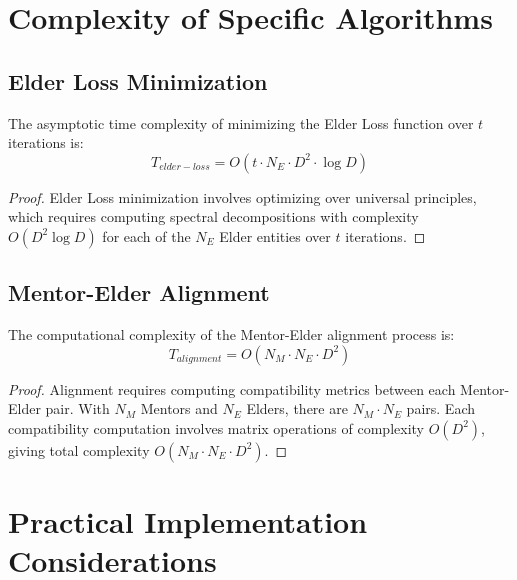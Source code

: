 \section{Complexity of Specific Algorithms}

\subsection{Elder Loss Minimization}

\begin{theorem}
The asymptotic time complexity of minimizing the Elder Loss function over $t$ iterations is:
\begin{equation}
T_{elder-loss} = O(t \cdot N_E \cdot D^2 \cdot \log D)
\end{equation}
\end{theorem}

\begin{proof}
Elder Loss minimization involves optimizing over universal principles, which requires computing spectral decompositions with complexity $O(D^2 \log D)$ for each of the $N_E$ Elder entities over $t$ iterations.
\end{proof}

\subsection{Mentor-Elder Alignment}

\begin{theorem}
The computational complexity of the Mentor-Elder alignment process is:
\begin{equation}
T_{alignment} = O(N_M \cdot N_E \cdot D^2)
\end{equation}
\end{theorem}

\begin{proof}
Alignment requires computing compatibility metrics between each Mentor-Elder pair. With $N_M$ Mentors and $N_E$ Elders, there are $N_M \cdot N_E$ pairs. Each compatibility computation involves matrix operations of complexity $O(D^2)$, giving total complexity $O(N_M \cdot N_E \cdot D^2)$.
\end{proof}

\section{Practical Implementation Considerations}

